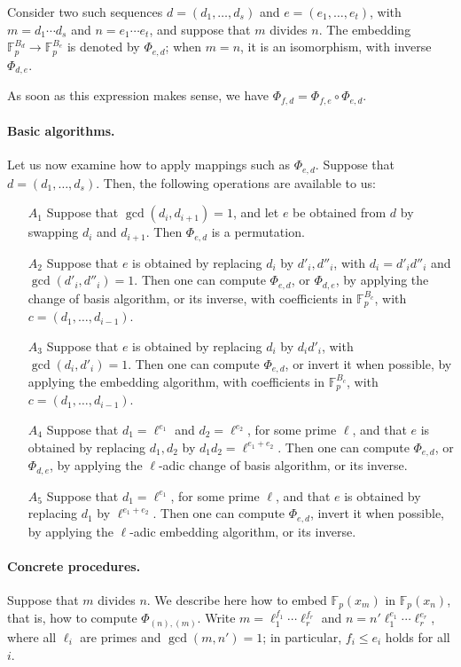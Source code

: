 \documentclass[12pt]{article}
\def\F {\ensuremath{\mathbb{F}}}
\begin{document}
Consider two such sequences $d=(d_1,\dots,d_s)$ and
$e=(e_1,\dots,e_t)$, with $m=d_1 \cdots d_s$ and $n=e_1 \cdots e_t$,
and suppose that $m$ divides $n$. The embedding $\F_p^{B_d} \to
\F_p^{B_e}$ is denoted by $\Phi_{e,d}$; when $m=n$, it is an
isomorphism, with inverse $\Phi_{d,e}$.

As soon as this expression makes sense, we have $\Phi_{f,d} =
\Phi_{f,e}\circ \Phi_{e,d}$.

\paragraph{Basic algorithms.}
Let us now examine how to apply mappings such as $\Phi_{e,d}$.
Suppose that $d=(d_1,\dots,d_s)$. Then, the following operations are
available to us:
\begin{itemize}
\item[$A_1$] Suppose that $\gcd(d_i,d_{i+1})=1$, and let $e$ be
  obtained from $d$ by swapping $d_i$ and $d_{i+1}$. Then $\Phi_{e,d}$
  is a permutation.
\item[$A_2$] Suppose that $e$ is obtained by replacing $d_i$ by $d'_i,
  d''_i$, with $d_i = d'_i d''_i$ and $\gcd(d'_i,d''_i)=1$. Then one
  can compute $\Phi_{e,d}$, or $\Phi_{d,e}$, by applying the change of
  basis algorithm, or its inverse, with coefficients in
  $\F_p^{B_c}$, with $c=(d_1,\dots,d_{i-1})$.
\item[$A_3$] Suppose that $e$ is obtained by replacing $d_i$ by $d_i
  d'_i$, with $\gcd(d_i, d'_i)=1$. Then one can compute $\Phi_{e,d}$,
  or invert it when possible, by applying the embedding algorithm,
  with coefficients in $\F_p^{B_c}$, with $c=(d_1,\dots,d_{i-1})$.
\item[$A_4$] Suppose that $d_1=\ell^{e_1}$ and $d_2=\ell^{e_2}$, for some
  prime $\ell$, and that $e$ is obtained by replacing $d_1,d_2$ by
  $d_1 d_2=\ell^{e_1+e_2}$. Then one can compute $\Phi_{e,d}$, or
  $\Phi_{d,e}$, by applying the $\ell$-adic change of basis algorithm,
  or its inverse. 
\item[$A_5$] Suppose that $d_1=\ell^{e_1}$, for some prime $\ell$, and that
  $e$ is obtained by replacing $d_1$ by $\ell^{e_1+e_2}$. Then one can
  compute $\Phi_{e,d}$, invert it when possible, by applying the
  $\ell$-adic embedding algorithm, or its inverse. 
\end{itemize}

\paragraph{Concrete procedures.} Suppose that $m$ divides $n$. We 
describe here how to embed $\F_p(x_m)$ in $\F_p(x_n)$, that is, how to
compute $\Phi_{(n),(m)}$. Write $m= \ell_1^{f_1}\cdots \ell_r^{f_r}$
and $n = n' \ell_1^{e_1}\cdots \ell_r^{e_r}$, where all $\ell_i$ are
primes and $\gcd(m,n')=1$; in particular, $f_i \le e_i$ holds for all
$i$.
\end{document}
